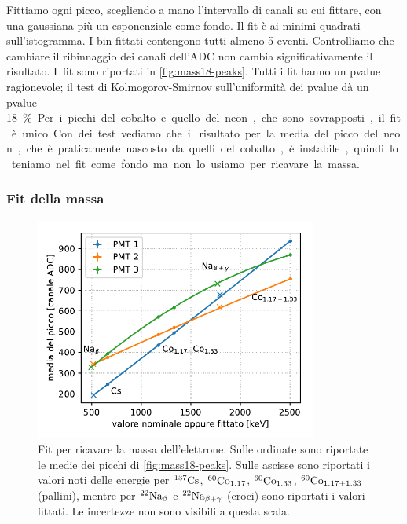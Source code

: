 Fittiamo ogni picco, scegliendo a mano l'intervallo di canali su cui fittare,
con una gaussiana più un esponenziale come fondo.
Il fit è ai minimi quadrati sull'istogramma.
I bin fittati contengono tutti almeno 5 eventi.
Controlliamo che cambiare il ribinnaggio dei canali dell'ADC non cambia significativamente il risultato.
I~fit sono riportati in \autoref{fig:mass18-peaks}.
Tutti i fit hanno un pvalue ragionevole;
il test di Kolmogorov-Smirnov sull'uniformità dei pvalue dà un pvalue \SI{18}\%.
Per i picchi del cobalto e quello del neon, che sono sovrapposti, il fit è unico.
Con dei test vediamo che il risultato per la media del picco del neon,
che è praticamente nascosto da quelli del cobalto,
è instabile, quindi lo teniamo nel fit come fondo ma non lo usiamo per ricavare la massa.

\subsubsection{Fit della massa}

\begin{figure}
	\centering
	\includegraphics[width=25em]{immagini/mass18-cal}
	\caption{\label{fig:mass18-cal}
	Fit per ricavare la massa dell'elettrone.
	Sulle ordinate sono riportate le medie dei picchi di \autoref{fig:mass18-peaks}.
	Sulle ascisse sono riportati i valori noti delle energie
	per $^{\text{137}}\text{Cs}$, $^{\text{60}}\text{Co}_{1.17}$, $^{\text{60}}\text{Co}_{1.33}$, $^{\text{60}}\text{Co}_{1.17+1.33}$ (pallini),
	mentre per $^{\text{22}}\text{Na}_\beta$ e $^{\text{22}}\text{Na}_{\beta+\gamma}$ (croci) sono riportati i valori fittati.
	Le incertezze non sono visibili a questa scala.}
\end{figure}

